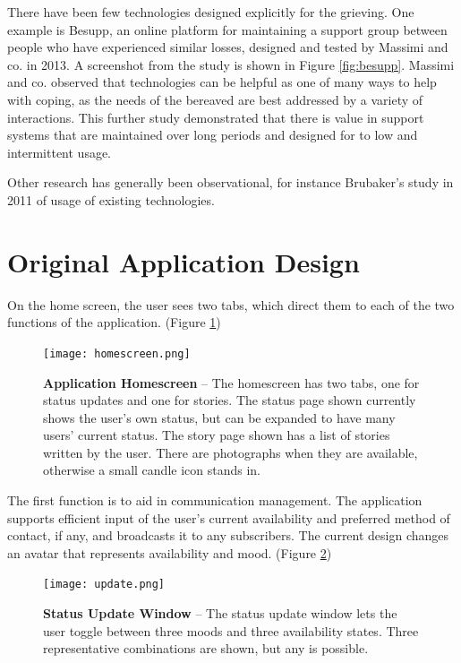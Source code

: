   There have been few technologies designed explicitly for the grieving. One
  example is Besupp, an online platform for maintaining a support group between
  people who have experienced similar losses, designed and tested by Massimi and
  co. in 2013. \cite{mm13}
  A screenshot from the study is shown in Figure \ref{fig:besupp}.
  Massimi and co. observed that technologies can be helpful as
  one of many ways to help with coping, as the needs of the bereaved are best
  addressed by a variety of interactions.
  This further study demonstrated that
  there is value in support systems that are maintained over long periods and
  designed for to low and intermittent usage.

  Other research has generally been observational, for instance Brubaker's study
  in 2011 of usage of existing technologies. \cite{brubaker11}

\section{Original Application Design}
On the home screen, the user sees two tabs,
which direct them to each of the two functions of the application.
(Figure \ref{fig:homescreen})

\begin{figure}
\caption[InMourning Home Screen]{\textbf{Application Homescreen} --
The homescreen has two tabs, one for status updates and one for stories.
The status page shown currently shows the user's own status,
but can be expanded to have many users' current status.
The story page shown has a list of stories written by the user. There are photographs
when they are available, otherwise a small candle icon stands in.
}
\centering
\texttt{[image: homescreen.png]}
\label{fig:homescreen}
\end{figure}

The first function is to aid in communication management.
The application supports efficient input of the user's current availability
and preferred method of
contact, if any, and broadcasts it to any subscribers.
The current design changes an avatar that represents availability and mood.
(Figure \ref{fig:update})

\begin{figure}
\caption[InMourning Status Update]{\textbf{Status Update Window} --
The status update window lets the user toggle between three moods
and three availability states.
Three representative combinations are shown, but any is possible.
}
\centering
\texttt{[image: update.png]}
\label{fig:update}
\end{figure}

